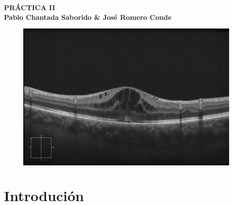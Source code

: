 \documentclass{article}
\begin{document}
	\begin{center}
		\LARGE\bfseries PRÁCTICA II\\
		\small Pablo Chantada Saborido \& José Romero Conde
	\end{center}
	
	\begin{center}
	\end{center}
	
\vspace*{300pt}
	
\begin{figure}[H]
	\centering
	\includegraphics[width=0.7\linewidth]{figuras/portada.jpg}
	\label{fig:portada}
\end{figure}
	
\thispagestyle{empty}
	
\newpage

\tableofcontents

\newpage
	
	
\section{Introdución}
\end{document}
